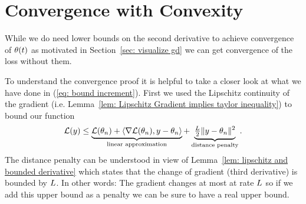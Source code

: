 \section{Convergence with Convexity}\label{sec: convex convergence theorems}

While we do need lower bounds on the second derivative to achieve convergence
of \(\theta(t)\) as motivated in Section~\ref{sec: visualize gd} we can get
convergence of the loss without them.

To understand the convergence proof it is helpful to take a closer look at
what we have done in (\ref{eq: bound increment}). First we used the Lipschitz
continuity of the gradient (i.e. Lemma~\ref{lem: Lipschitz Gradient implies taylor inequality})
to bound our function
%
\begin{align}\label{eq: lin approx + distance penalty notion}
	\mathcal{L}(y)
	\le \underbrace{
		\mathcal{L}(\theta_n)+ \langle\nabla\mathcal{L}(\theta_n), y-\theta_n\rangle 
	}_{\text{linear approximation}}
	+ \underbrace{\tfrac{L}{2} \|y-\theta_n\|^2}_{\text{distance penalty}}.
\end{align}
%
The distance penalty can be understood in view of Lemma~\ref{lem: lipschitz and bounded derivative}
which states that the change of gradient (third derivative) is bounded by \(L\).
In other words: The gradient changes at most at rate \(L\) so if we
add this upper bound as a penalty we can be sure to have a real upper bound.

